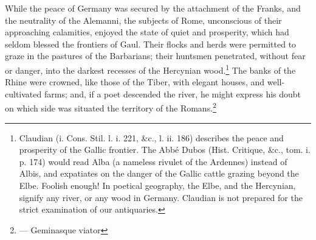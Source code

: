 While the peace of Germany was secured by the attachment of the Franks, and the neutrality of the Alemanni, the subjects of Rome, unconscious of their approaching calamities, enjoyed the state of quiet and prosperity, which had seldom blessed the frontiers of Gaul. Their flocks and herds were permitted to graze in the pastures of the Barbarians; their huntsmen penetrated, without fear or danger, into the darkest recesses of the Hercynian wood.\footnote{Claudian (i. Cons. Stil. l. i. 221, \&c., l. ii. 186) describes the peace and prosperity of the Gallic frontier. The Abbé Dubos (Hist. Critique, \&c., tom. i. p. 174) would read Alba (a nameless rivulet of the Ardennes) instead of Albis, and expatiates on the danger of the Gallic cattle grazing beyond the Elbe. Foolish enough! In poetical geography, the Elbe, and the Hercynian, signify any river, or any wood in Germany. Claudian is not prepared for the strict examination of our antiquaries.} The banks of the Rhine were crowned, like those of the Tiber, with elegant houses, and well-cultivated farms; and, if a poet descended the river, he might express his doubt on which side was situated the territory of the Romans.\footnote{\texthebrew{—} Geminasque viator

}

